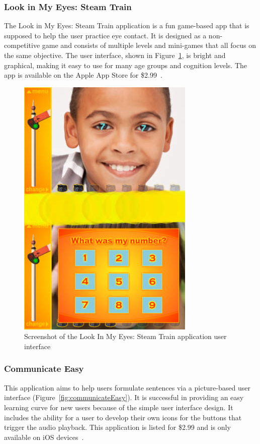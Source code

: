 \subsubsection{Look in My Eyes: Steam Train}
The Look in My Eyes: Steam Train application is a fun game-based app that is supposed to help the user practice eye contact. It is designed as a non-competitive game and consists of multiple levels and mini-games that all focus on the same objective. The user interface, shown in Figure~\ref{fig:lookInMyEyes}, is bright and graphical, making it easy to use for many age groups and cognition levels. The app is available on the Apple App Store for \$2.99~\cite{lookInMyEyes}.

\begin{figure}[!htb]
\centering
\includegraphics[width=.6\textwidth]{lookInMyEyes.png}
\caption{\label{fig:lookInMyEyes}Screenshot of the Look In My Eyes: Steam Train application user interface}
\end{figure}

\subsubsection{Communicate Easy}
This application aims to help users formulate sentences via a picture-based user interface (Figure~\ref{fig:communicateEasy}). It is successful in providing an easy learning curve for new users because of the simple user interface design. It includes the ability for a user to develop their own icons for the buttons that trigger the audio playback. This application is listed for \$2.99 and is only available on iOS devices~\cite{communicateEasy}.


